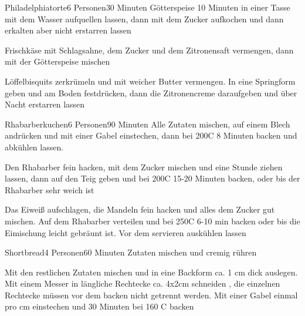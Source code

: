 
\begin{recipe}{Philadelphiatorte}{6 Personen}{30 Minuten}
Götterspeise 10 Minuten in einer Tasse mit dem Wasser aufquellen lassen, dann mit dem Zucker aufkochen und dann erkalten aber nicht erstarren lassen

Frischkäse mit Schlagsahne, dem Zucker und dem Zitronensaft vermengen, dann mit der Götterspeise mischen

Löffelbisquits zerkrümeln und mit weicher Butter vermengen.
In eine Springform geben und am Boden festdrücken, dann die Zitronencreme daraufgeben und über Nacht erstarren lassen
\end{recipe}


\begin{recipe}{Rhabarberkuchen}{6 Personen}{90 Minuten}
Alle Zutaten mischen, auf einem Blech andrücken und mit einer Gabel einstechen, dann bei 200\0C 8 Minuten backen und abkühlen lassen.

Den Rhabarber fein hacken, mit dem Zucker mischen und eine Stunde ziehen lassen, dann auf den Teig geben und bei 200\0C 15-20 Minuten backen, oder bis der Rhabarber sehr weich ist

Das Eiweiß aufschlagen, die Mandeln fein hacken und alles dem Zucker gut mischen.
Auf dem Rhabarber verteilen und bei 250\0C 6-10 min backen oder bis die Eimischung leicht gebräunt ist.
Vor dem servieren auskühlen lassen
\end{recipe}


\begin{recipe}{Shortbread}{4 Personen}{60 Minuten}
Zutaten mischen und cremig rühren

Mit den restlichen Zutaten mischen und in eine Backform ca. 1 cm dick auslegen. Mit einem Messer in längliche Rechtecke ca. 4x2cm schneiden , die einzelnen Rechtecke müssen vor dem backen nicht getrennt werden. Mit einer Gabel einmal pro cm einstechen und 30 Minuten bei 160 \0C backen

\end{recipe} 

